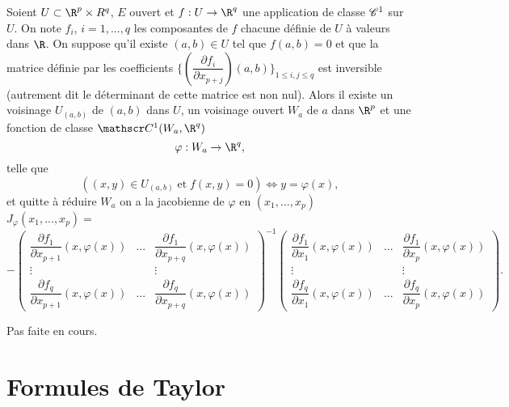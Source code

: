\documentclass[class=report,crop=false]{standalone}
\begin{document}
\begin{proposition}  
\textcolor[rgb]{0.44,0.00,0.87}{ 
Soient $U \subset \R^p \times R^q$, $E$ ouvert et $f:U \rightarrow \R^q$ une application
de classe $\mathscr{C}^1$ sur $U$. On note $f_i$, $i=1,...,q$ les composantes de $f$ chacune définie de $U$ à valeurs dans $\R$. On suppose qu'il existe $(a,b) \in U$ tel que  
$f(a,b)=0$ et que la matrice définie par les coefficients
$\lbrace(\dfrac{\partial f_i}{\partial x_{p+j}})(a,b)\rbrace_{1 \leq i,j \leq q} $ est inversible (autrement dit le déterminant de cette matrice
est non nul).
Alors il existe un voisinage $U_{(a,b)}$ de $(a,b)$ dans $U$, un voisinage
ouvert $W_a$ de $a$ dans $\R^p$ et une fonction de classe $\co^1 (W_a, \R^q)$
\begin{equation*}
\varphi: W_a \rightarrow \R^q,
\end{equation*}
telle que
\begin{equation*}
((x,y) \in U_{(a,b)} \;\mathrm{et\;} f(x,y)=0)\Leftrightarrow y=\varphi(x),
\end{equation*}
et quitte à réduire $W_a$ on a la jacobienne de $\varphi$ en $(x_1,...,x_p)$\\
$J_{\varphi}(x_1,...,x_p)= $
\begin{equation*}
-\left(
\begin{array}{lll}
\dfrac{\partial f_1}{\partial x_{p+1}}(x,\varphi(x))&...&\dfrac{\partial f_1}{\partial x_{p+q}}(x,\varphi(x))\\
\vdots & &\vdots\\
\dfrac{\partial f_q}{\partial x_{p+1}}(x,\varphi(x))&...&\dfrac{\partial f_q}{\partial x_{p+q}}(x,\varphi(x))
 \end{array}
\right)^{-1}
\left(
\begin{array}{lll}
\dfrac{\partial f_1}{\partial x_{1}}(x,\varphi(x))&...&\dfrac{\partial f_1}{\partial x_{p}}(x,\varphi(x))\\
\vdots & &\vdots\\
\dfrac{\partial f_q}{\partial x_{1}}(x,\varphi(x))&...&\dfrac{\partial f_q}{\partial x_{p}}(x,\varphi(x))
 \end{array}
\right).
\end{equation*}
 }
\end{proposition}

 Pas faite en cours.



\chapter{Formules de Taylor}
\end{document}
